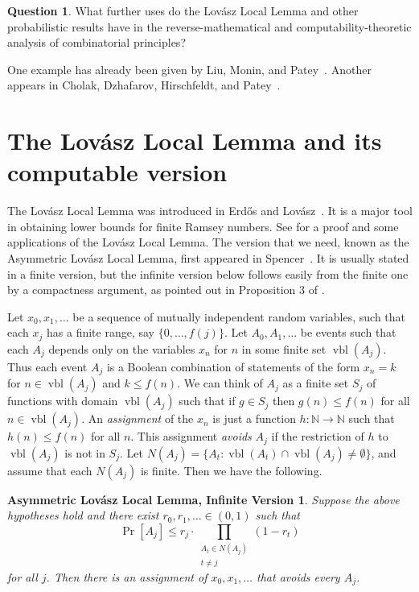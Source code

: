 \documentclass{amsart}
\newtheorem*{lov}{Asymmetric Lov{\'a}sz Local Lemma, Infinite Version}
\theoremstyle{definition}
\newtheorem{q}[thm]{Question}
\renewcommand{\leq}{\leqslant}
\DeclareMathOperator{\pr}{Pr}
\DeclareMathOperator{\vbl}{vbl}
\begin{document}
\begin{q}
What further uses do the Lov\'asz Local Lemma and other probabilistic
results have in the reverse-mathematical and computability-theoretic
analysis of combinatorial principles?
\end{q}

One example has already been given by Liu, Monin, and
Patey~\cite{LMP}. Another appears in Cholak, Dzhafarov, Hirschfeldt,
and Patey~\cite{CDHP}.


\section{The Lov{\'a}sz Local Lemma and its computable version}

The Lov{\'a}sz Local Lemma was introduced in Erd{\H o}s and
Lov{\'asz}~\cite{EL}. It is a major tool in obtaining lower bounds for
finite Ramsey numbers. See \cite[Section 4.2]{GRS} for a proof and
some applications of the Lov\'asz Local Lemma. The version that we
need, known as the Asymmetric Lov{\'a}sz Local Lemma, first appeared
in Spencer~\cite{S}. It is usually stated in a finite version, but the
infinite version below follows easily from the finite one by a
compactness argument, as pointed out in Proposition 3 of \cite{RS}.

Let $x_0,x_1,\ldots$ be a sequence of mutually independent random
variables, such that each $x_j$ has a finite range, say
$\{0,\ldots,f(j)\}$. Let $A_0,A_1,\ldots$ be events such that each
$A_j$ depends only on the variables $x_n$ for $n$ in some finite set
$\vbl(A_j)$. Thus each event $A_j$ is a Boolean combination of
statements of the form $x_n = k$ for $n \in \vbl(A_j)$ and $k \leq
f(n)$. We can think of $A_j$ as a finite set $S_j$ of functions with
domain $\vbl(A_j)$ such that if $g \in S_j$ then $g(n) \leq f(n)$ for
all $n \in \vbl(A_j)$. An \emph{assignment} of the $x_n$ is just a
function $h : \mathbb N \rightarrow \mathbb N$ such that $h(n) \leq
f(n)$ for all $n$. This assignment \emph{avoids} $A_j$ if the
restriction of $h$ to $\vbl(A_j)$ is not in $S_j$. Let $N(A_j) =
\{A_t : \vbl(A_t) \cap \vbl (A_j) \neq \emptyset\}$, and assume that
each $N(A_j)$ is finite. Then we have the following.

\begin{lov}
Suppose the above hypotheses hold and there exist $r_0,r_1,\ldots \in
(0,1)$ such that
$$
\pr[A_j] \leq r_j \cdot \prod_{\substack{A_t \in N(A_j) \\ t \neq j}} (1-r_t)
$$
for all $j$. Then there is an assignment of $x_0,x_1,\ldots$ that
avoids every $A_j$.
\end{lov}
\end{document}
